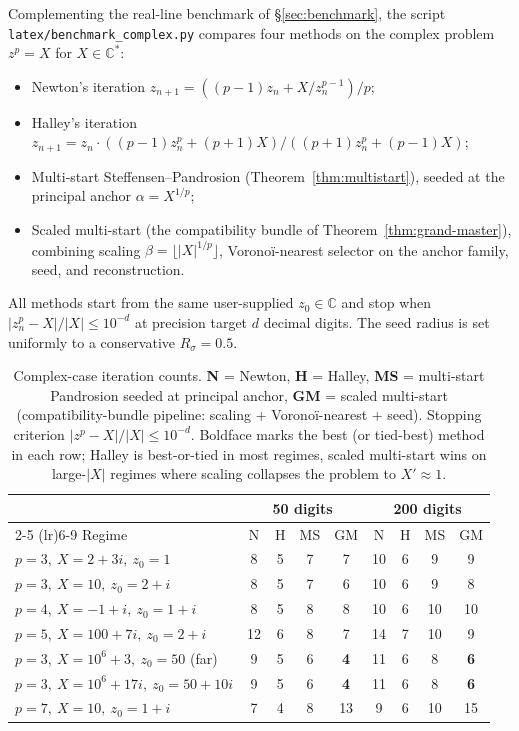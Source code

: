 \documentclass[11pt,a4paper]{article}
\theoremstyle{definition}
\begin{document}
Complementing the real-line benchmark of \S\ref{sec:benchmark}, the script \texttt{latex/benchmark\_complex.py} compares four methods on the complex problem $z^p = X$ for $X \in \mathbb{C}^\ast$:
\begin{itemize}
  \item Newton's iteration $z_{n+1} = ((p-1)z_n + X/z_n^{p-1})/p$;
  \item Halley's iteration $z_{n+1} = z_n \cdot ((p-1)z_n^p + (p+1)X)/((p+1)z_n^p + (p-1)X)$;
  \item Multi-start Steffensen--Pandrosion (Theorem~\ref{thm:multistart}), seeded at the principal anchor $\alpha = X^{1/p}$;
  \item Scaled multi-start (the compatibility bundle of Theorem~\ref{thm:grand-master}), combining scaling $\beta = \lfloor |X|^{1/p} \rfloor$, Voronoï-nearest selector on the anchor family, seed, and reconstruction.
\end{itemize}
All methods start from the same user-supplied $z_0 \in \mathbb{C}$ and stop when $|z_n^p - X|/|X| \leq 10^{-d}$ at precision target $d$ decimal digits. The seed radius is set uniformly to a conservative $R_\sigma = 0.5$.

\begin{table}[H]
\centering
\footnotesize
\renewcommand{\arraystretch}{1.15}
\begin{tabular}{@{}lcccccccc@{}}
\toprule
& \multicolumn{4}{c}{\textbf{50 digits}} & \multicolumn{4}{c}{\textbf{200 digits}} \\
\cmidrule(lr){2-5} \cmidrule(lr){6-9}
Regime & N & H & MS & GM & N & H & MS & GM \\
\midrule
$p=3,\ X=2+3i,\ z_0 = 1$                   & 8  & 5 & 7 & 7  & 10 & 6 & 9  & 9  \\
$p=3,\ X=10,\ z_0 = 2+i$                   & 8  & 5 & 7 & 6  & 10 & 6 & 9  & 8  \\
$p=4,\ X=-1+i,\ z_0 = 1+i$                 & 8  & 5 & 8 & 8  & 10 & 6 & 10 & 10 \\
$p=5,\ X=100+7i,\ z_0 = 2+i$               & 12 & 6 & 8 & 7  & 14 & 7 & 10 & 9  \\
$p=3,\ X=10^6+3,\ z_0 = 50$ (far)          & 9  & 5 & 6 & \textbf{4} & 11 & 6 & 8 & \textbf{6} \\
$p=3,\ X=10^6+17i,\ z_0 = 50+10i$          & 9  & 5 & 6 & \textbf{4} & 11 & 6 & 8 & \textbf{6} \\
$p=7,\ X=10,\ z_0 = 1+i$                   & 7  & 4 & 8 & 13 & 9  & 6 & 10 & 15 \\
\bottomrule
\end{tabular}
\caption{Complex-case iteration counts. \textbf{N} = Newton, \textbf{H} = Halley, \textbf{MS} = multi-start Pandrosion seeded at principal anchor, \textbf{GM} = scaled multi-start (compatibility-bundle pipeline: scaling + Voronoï-nearest + seed). Stopping criterion $|z^p - X|/|X| \leq 10^{-d}$. Boldface marks the best (or tied-best) method in each row; Halley is best-or-tied in most regimes, scaled multi-start wins on large-$|X|$ regimes where scaling collapses the problem to $X' \approx 1$.}
\label{tab:benchmark-complex}
\end{table}
\end{document}
